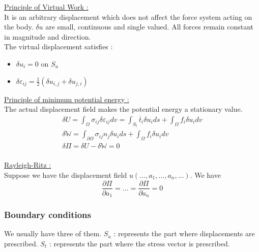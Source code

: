 \documentclass[../main.tex]{subfiles}
\begin{document}
\quad \underline{Principle of Virtual Work :}\\

It is an arbitrary displacement which does not affect the force system acting on the body. $\delta u$ are small, continuous and single valued. All forces remain constant in magnitude and direction.\\

The virtual displacement satisfies : \begin{itemize}
    \item $\delta u_i = 0$ on $S_u$\\
    \item $\delta \varepsilon_{ij} = \frac{1}{2}(\delta u_{i,j} + \delta u_{j,i})$\\
\end{itemize}

\quad \underline{Principle of minimum potential energy :}\\

The actual displacement field makes the potential energy a stationary value.\\

\begin{equation}
    \begin{gathered}
        \delta U = \int_\Omega \sigma_{ij} \delta \varepsilon_{ij} dv = \int_{S_t} \overline{t}_i \delta u_i ds+ \int_\Omega f_i \delta u_i dv\\
        \delta \mathbb{W} = \int_{\partial \Omega} \sigma_{ij} n_j \delta u_i ds + \int_\Omega f_i \delta u_idv\\
        \delta \Pi = \delta U - \delta \mathbb{W} = 0\\
    \end{gathered}
\end{equation}

\quad \underline{Rayleigh-Ritz :}\\
Suppose we have the displacement field $u(\dots, a_1,\dots, a_n, \dots)$. We have \begin{equation}
    \frac{\partial \Pi}{\partial a_1} = \dots = \frac{\partial \Pi}{\partial a_n} = 0
\end{equation}

\subsubsection{Boundary conditions}
We usually have three of them. $S_u$ : represents the part where displacements are prescribed. $S_t$ : represents the part where the stress vector is prescribed.\\
\end{document}
